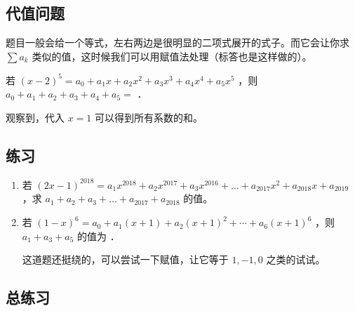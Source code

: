 \subsection{代值问题}

题目一般会给一个等式，左右两边是很明显的二项式展开的式子。而它会让你求 $\sum a_k$ 类似的值，这时候我们可以用赋值法处理（标答也是这样做的）。

\begin{example}
    若 $(x-2)^{5}=a_{0}+a_{1} x+a_{2} x^{2}+a_{3} x^{3}+a_{4} x^{4}+a_{5} x^{5}$ ，则 $a_{0}+a_{1}+a_{2}+a_{3}+a_{4}+a_{5}=$ \underline{\hspace{2cm}} ．

\end{example}

\begin{solution}
    观察到，代入 $x = 1$ 可以得到所有系数的和。
\end{solution}

\subsection*{练习}

\begin{enumerate}

    \item 若 $(2x-1)^{2018} = a_1 x^{2018} + a_2 x^{2017} + a_3 x^{2016} + \dots + a_{2017} x^2 + a_{2018} x + a_{2019}$ ，求 $a_1 + a_2 + a_3 + \dots + a_{2017} + a_{2018}$ 的值。

    \item
          若 $(1-x)^{6}=a_{0}+a_{1}(x+1)+a_{2}(x+1)^{2}+\cdots+a_{6}(x+1)^{6}$ ，则 $a_{1}+a_{3}+a_{5}$ 的值为 \underline{\hspace{2cm}} ．

          \begin{tips}
              这道题还挺绕的，可以尝试一下赋值，让它等于 $1,-1,0$ 之类的试试。
          \end{tips}

          \begin{note}
              \vspace{2cm}
          \end{note}
\end{enumerate}

\subsection{总练习}

